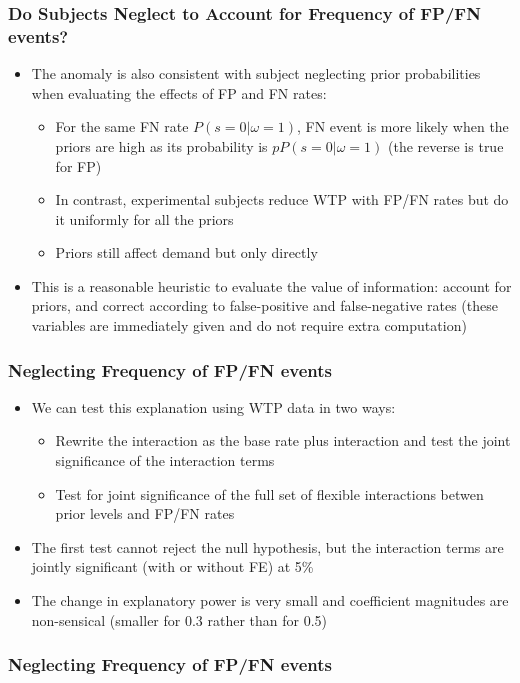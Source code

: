 \documentclass[11pt,hyperref={bookmarks=false}]{beamer}
\begin{document}
\begin{frame}
\frametitle{Do Subjects Neglect to Account for Frequency of FP/FN events?}
\begin{itemize}
\item The anomaly is also consistent with subject neglecting prior probabilities when evaluating the effects of FP and FN rates:
\begin{itemize}
\item For the same FN rate $P(s=0|\omega=1)$, FN event is more likely when the priors are high as its probability is $pP(s=0|\omega=1)$ (the reverse is true for FP)
\item In contrast, experimental subjects reduce WTP with FP/FN rates but do it uniformly for all the priors
\item Priors still affect demand but only directly
\end{itemize}
\item This is a reasonable heuristic to evaluate the value of information: account for priors, and correct according to false-positive and false-negative rates (these variables are immediately given and do not require extra computation)
\end{itemize}
\end{frame}



\begin{frame}
\frametitle{Neglecting Frequency of FP/FN events}
\begin{itemize}
\item We can test this explanation using WTP data in two ways:
\begin{itemize}
\item Rewrite the interaction as the base rate plus interaction and test the joint significance of the interaction terms
\item Test for joint significance of the full set of flexible interactions betwen prior levels and FP/FN rates
\end{itemize}
\item The first test cannot reject the null hypothesis, but the interaction terms are jointly significant (with or without FE) at 5\%
\item The change in explanatory power is very small and coefficient magnitudes are non-sensical (smaller for 0.3 rather than for 0.5)
\end{itemize}
\end{frame}


\begin{frame}
\frametitle{Neglecting Frequency of FP/FN events}
\scriptsize
\begin{center}

\end{center}
\end{frame}
\end{document}
